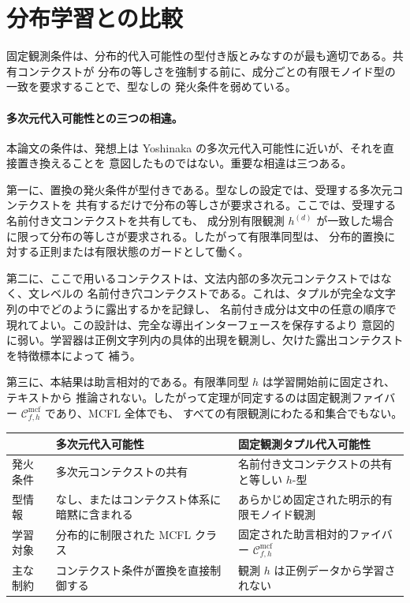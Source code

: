 \documentclass[11pt,a4paper]{ltjsarticle}
\theoremstyle{remark}
\newcommand{\Cmcf}[2]{\mathcal{C}^{\mathrm{mcf}}_{#1,#2}}
\begin{document}
\section{分布学習との比較}
\label{sec:comparison}

固定観測条件は、分布的代入可能性の型付き版とみなすのが最も適切である。共有コンテクストが
分布の等しさを強制する前に、成分ごとの有限モノイド型の一致を要求することで、型なしの
発火条件を弱めている。

\paragraph{多次元代入可能性との三つの相違。}
本論文の条件は、発想上は Yoshinaka の多次元代入可能性に近いが、それを直接置き換えることを
意図したものではない。重要な相違は三つある。

第一に、置換の発火条件が型付きである。型なしの設定では、受理する多次元コンテクストを
共有するだけで分布の等しさが要求される。ここでは、受理する名前付き文コンテクストを共有しても、
成分別有限観測 \(h^{(d)}\) が一致した場合に限って分布の等しさが要求される。したがって有限準同型は、
分布的置換に対する正則または有限状態のガードとして働く。

第二に、ここで用いるコンテクストは、文法内部の多次元コンテクストではなく、文レベルの
名前付き穴コンテクストである。これは、タプルが完全な文字列の中でどのように露出するかを記録し、
名前付き成分は文中の任意の順序で現れてよい。この設計は、完全な導出インターフェースを保存するより
意図的に弱い。学習器は正例文字列内の具体的出現を観測し、欠けた露出コンテクストを特徴標本によって
補う。

第三に、本結果は助言相対的である。有限準同型 \(h\) は学習開始前に固定され、テキストから
推論されない。したがって定理が同定するのは固定観測ファイバー \(\Cmcf{f}{h}\) であり、MCFL 全体でも、
すべての有限観測にわたる和集合でもない。

\begin{center}
\begin{tabular}{|p{}|p{}|p{}|}
\hline
 & 多次元代入可能性 & 固定観測タプル代入可能性 \\
\hline
発火条件 & 多次元コンテクストの共有 & 名前付き文コンテクストの共有と等しい \(h\)-型 \\
\hline
型情報 & なし、またはコンテクスト体系に暗黙に含まれる & あらかじめ固定された明示的有限モノイド観測 \\
\hline
学習対象 & 分布的に制限された MCFL クラス & 固定された助言相対的ファイバー \(\Cmcf{f}{h}\) \\
\hline
主な制約 & コンテクスト条件が置換を直接制御する & 観測 \(h\) は正例データから学習されない \\
\hline
\end{tabular}
\end{center}
\end{document}
